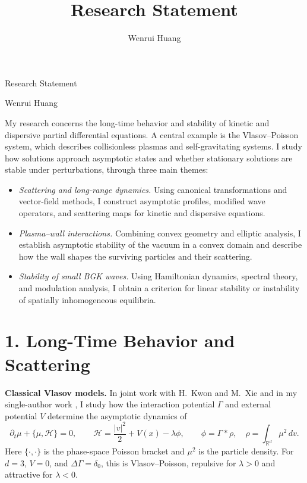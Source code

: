 \documentclass[10pt,reqno]{amsart}
\title{Research Statement}
\author{Wenrui Huang}
\newcommand{\pr}{\partial}
\newcommand{\Ham}{\mathcal H}
\newcommand{\R}{\mathbb R}
\begin{document}
\begin{center}
{\LARGE Research Statement}\medskip

{\large Wenrui Huang}
\end{center}
\vspace{10pt}

My research concerns the long-time behavior and stability of kinetic and dispersive partial differential equations. A central example is the Vlasov--Poisson system, which describes collisionless plasmas and self-gravitating systems. I study how solutions approach asymptotic states and whether stationary solutions are stable under perturbations, through three main themes:
\begin{itemize}
\item \emph{Scattering and long-range dynamics.} Using canonical transformations and vector-field methods, I construct asymptotic profiles, modified wave operators, and scattering maps for kinetic and dispersive equations.
\item \emph{Plasma--wall interactions.} Combining convex geometry and elliptic analysis, I establish asymptotic stability of the vacuum in a convex domain and describe how the wall shapes the surviving particles and their scattering.
\item \emph{Stability of small BGK waves.} Using Hamiltonian dynamics, spectral theory, and modulation analysis, I obtain a criterion for linear stability or instability of spatially inhomogeneous equilibria.
\end{itemize}

\section*{1. Long-Time Behavior and Scattering}

\noindent\textbf{Classical Vlasov models.}
In joint work with H.~Kwon and M.~Xie and in my single-author work \cite{HK24,HK26,H26,HX26b}, I study how the interaction potential $\Gamma$ and external potential $V$ determine the asymptotic dynamics of
\begin{equation}\label{eq:kinetic}
\pr_t\mu+\{\mu,\Ham\}=0,\qquad
\Ham=\frac{|v|^2}{2}+V(x)-\lambda\phi,\qquad
\phi=\Gamma*\rho,\quad \rho=\int_{\R^d}\mu^2\,dv.
\end{equation}
Here $\{\cdot,\cdot\}$ is the phase-space Poisson bracket and $\mu^2$ is the particle density. For $d=3$, $V=0$, and $\Delta\Gamma=\delta_0$, this is Vlasov--Poisson, repulsive for $\lambda>0$ and attractive for $\lambda<0$.
\end{document}
